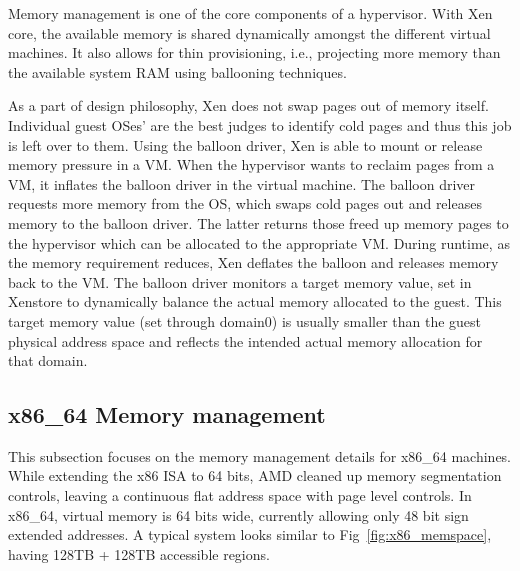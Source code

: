 Memory management is one of the core components of a hypervisor. With Xen core, the available memory is shared dynamically amongst the different virtual machines. It also allows for thin provisioning, i.e., projecting more memory than the available system RAM using ballooning techniques.

As a part of design philosophy, Xen does not swap pages out of memory itself. Individual guest OSes’ are the best judges to identify cold pages and thus this job is left over to them. Using the balloon driver, Xen is able to mount or release memory pressure in a VM. When the hypervisor wants to reclaim pages from a VM, it inflates the balloon driver in the virtual machine. The balloon driver requests more memory from the OS, which swaps cold pages out and releases memory to the balloon driver. The latter returns those freed up memory pages to the hypervisor which can be allocated to the appropriate VM. During runtime, as the memory requirement reduces, Xen deflates the balloon and releases memory back to the VM. The balloon driver monitors a target memory value, set in Xenstore to dynamically balance the actual memory allocated to the guest. This target memory value (set through domain0) is usually smaller than the guest physical address space and reflects the intended actual memory allocation for that domain. 
 

\subsection{x86\_64 Memory management}
 This subsection focuses on the memory management details for x86\_64 machines. While extending the x86 ISA to 64 bits, AMD cleaned up memory segmentation controls, leaving a continuous flat address space with page level controls. In x86\_64, virtual memory is 64 bits wide, currently allowing only 48 bit sign extended addresses. A typical system looks similar to Fig~\ref{fig:x86_memspace}, having 128TB + 128TB accessible regions. 

